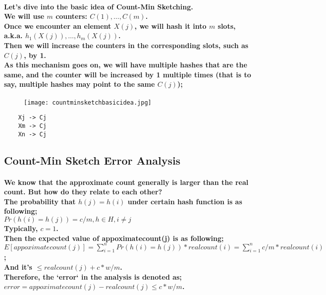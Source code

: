 \paragraph{
    Let's dive into the basic idea of Count-Min Sketching.\\
    We will use $m$ counters: $C(1), \ldots, C(m)$.\\
    Once we encounter an element $X(j)$, we will hash it into $m$ slots, a.k.a. $h_1(X(j)), \ldots, h_m(X(j))$.\\
    Then we will increase the counters in the corresponding slots, such as $C(j)$, by 1.\\
    As this mechanism goes on, we will have multiple hashes that are the same, and the counter will be increased by 1 multiple times
    (that is to say, multiple hashes may point to the same $C(j)$);\\
}

\begin{figure}[H]
    \texttt{[image: countminsketchbasicidea.jpg]}
\end{figure}

\begin{verbatim}
    Xj -> Cj
    Xm -> Cj
    Xn -> Cj
\end{verbatim}

\subsection{Count-Min Sketch Error Analysis}

\paragraph{
    We know that the approximate count generally is larger than the real count. But how do they relate to each other?\\
    The probability that $h(j) = h(i)$ under certain hash function is as following;\\
    $Pr(h(i)=h(j)) = c/m, h \in H, i \neq j$\\
    Typically, $c=1$.\\
    Then the expected value of appoximatecount(j) is as following;\\
    $E[appoximatecount(j)] = \sum_{i=1}^n Pr(h(i)=h(j)) * realcount(i) = \sum_{i=1}^n c/m * realcount(i)$;\\
    And it's $\leq realcount(j) + c*w/m$.\\
    Therefore, the `error` in the analysis is denoted as;\\
    $error = appoximatecount(j) - realcount(j) \leq c*w/m$.\\
}